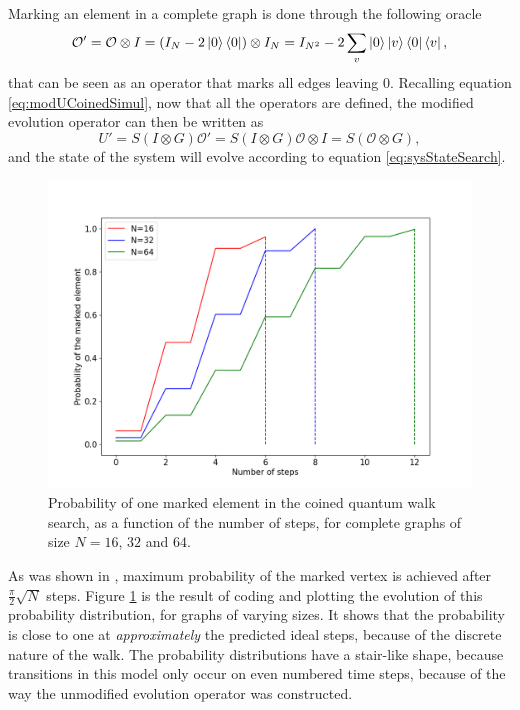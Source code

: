 \documentclass[../../dissertation.tex]{subfiles}
\begin{document}
Marking an element in a complete graph is done through the following oracle
\begin{equation}
	\mathcal{O'} =\mathcal{O}\otimes I = (I_N - 2\ket{0}\bra{0})\otimes I_N = I_{N^2} - 2 \sum_v \ket{0}\ket{v}\bra{0}\bra{v} ,
\end{equation}
that can be seen as an operator that marks all edges leaving $0$. Recalling equation
\eqref{eq:modUCoinedSimul}, now that all the operators are defined, the modified evolution
operator can then be written as
\begin{equation}
	U' = S(I \otimes G)\mathcal{O'} = S(I \otimes G)\mathcal{O} \otimes I = S (\mathcal{O} \otimes G),\label{eq:modifiedEvoCoined}
\end{equation}
and the state of the system will evolve according to equation \eqref{eq:sysStateSearch}.
\begin{figure}[!h]
	\centering
	\includegraphics[scale=0.40]{img/CoinedQuantumWalk/Search/CoinedSearch163264.png}
	\caption{Probability of one marked element in the coined quantum walk search, as a function of the number of steps, for complete graphs of size $N=16$, $32$ and $64$.}\label{fig:coinedSearch}
\end{figure}\par

As was shown in \cite{REN1}, maximum probability of the marked vertex is
achieved after $\frac{\pi}{2}\sqrt{N}$ steps. Figure \ref{fig:coinedSearch} is
the result of coding and plotting the evolution of this probability
distribution, for graphs of varying sizes. It shows that the probability is
close to one at \textit{approximately} the predicted ideal steps, because of
the discrete nature of the walk. The probability distributions have a
stair-like shape, because transitions in this model only occur on even numbered
time steps, because of the way the unmodified evolution
operator was constructed.\par
\end{document}
